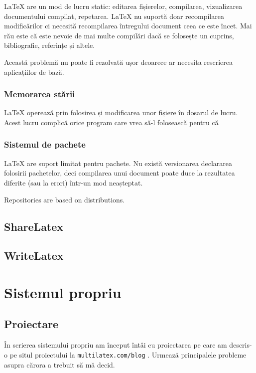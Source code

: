 \documentclass[a4wide,12pt]{report}
\newcommand{\cod}[1]{\texttt{#1}}
\newcommand{\idee}[1]{{\color{red} #1}}
\begin{document}
\LaTeX{} are un mod de lucru static: editarea fișierelor, compilarea,
vizualizarea documentului compilat, repetarea. \LaTeX{} nu suportă doar
recompilarea modificărilor ci necesită recompilarea întregului document ceea ce
este încet. Mai rău este că este nevoie de mai multe compilări dacă se folosește
un cuprins, bibliografie, referințe și altele.

Această problemă nu poate fi rezolvată ușor deoarece ar necesita rescrierea
aplicațiilor de bază.

\subsection{Memorarea stării}

\LaTeX{} operează prin folosirea și modificarea unor fișiere în dosarul de
lucru. Acest lucru complică orice program care vrea să-l folosească pentru că 

\subsection{Sistemul de pachete}

\LaTeX{} are suport limitat pentru pachete. Nu există versionarea declararea
folosirii pachetelor, deci compilarea unui document poate duce la rezultatea
diferite (sau la erori) într-un mod neașteptat.

\idee{Repositories are based on distributions.}

\section{ShareLatex}

\section{WriteLatex}

\chapter{Sistemul propriu}

\section{Proiectare}

În scrierea sistemului propriu am început întâi cu proiectarea pe care am
descris-o pe situl proiectului la \cod{multilatex.com/blog} . Urmează
principalele probleme asupra cărora a trebuit să mă decid.
\end{document}
